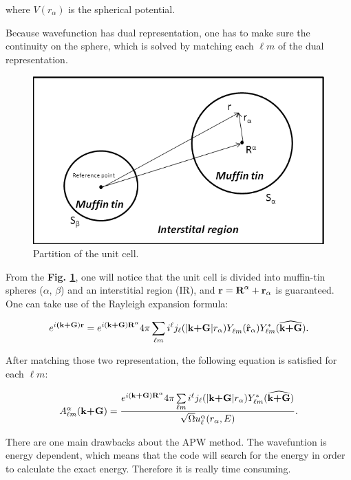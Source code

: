 \documentclass[a4paper, 12pt, titlepage,oneside,drop]{kthesis}
\begin{document}
where $V(r_{\alpha})$ is the spherical potential.

Because wavefunction has dual representation, one has to make sure the continuity on the sphere, which is solved by matching each $\ell m$
of the dual representation.

\begin{figure}[h]
\begin{center}
\includegraphics[scale=0.7]{Presentation1.png}
\caption{Partition of the unit cell.}
\label{ucuc}
\end{center}
\end{figure}

From the \textbf{Fig. \ref{ucuc}}, one will notice that the unit cell is divided into muffin-tin spheres ($\alpha$, $\beta$) and an
interstitial region (IR), and ${\textbf r={\textbf R^{\alpha}}+{\textbf r_{\alpha}}}$ is guaranteed. One can take use of the Rayleigh expansion formula:

\begin{equation}
\expg<(\textbf {k+G})>= e^{i (\textbf {k+G}) \textbf{R}^{\alpha} } 4 \pi \sumlm<\ell><m> i^{\ell} \bessf< |\textbf{k+G}|> \sphfr<\ell{m}><r><> \sphfq<\ell{m}><\textbf{k+G}><*> .
\end{equation}
  
After matching those two representation, the following equation is satisfied for each ${\ell}m$:

\begin{equation}
A _{{\ell}m}^{\alpha} (\textbf {k+G})= \frac{ e^{i (\textbf {k+G}) \textbf{R}^{\alpha} } 4 \pi \sumlm<\ell><m> i^{\ell} \bessf< |\textbf{k+G}|> \sphfq<\ell{m}><\textbf{k+G}><*> }{\sqrt{\Omega} u_{{\ell}}^{\alpha}(r_{\alpha}, E)}.
\end{equation}

There are one main drawbacks about the APW method. The wavefuntion is energy dependent, which means that
 the code will search for the energy in order to calculate the exact energy. Therefore it 
is really time consuming. 
\end{document}
